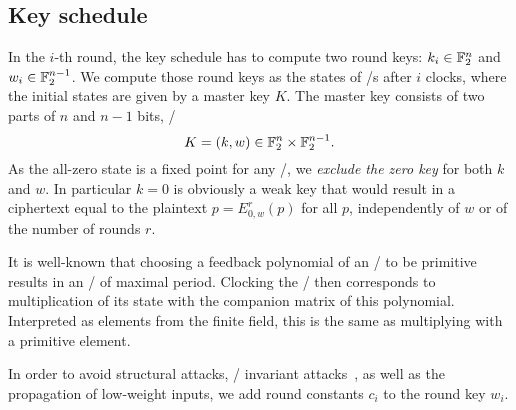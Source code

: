 \subsection{Key schedule}
In the $i$-th round, the key schedule has to compute two round keys: $k_i \in \mathbb{F}_2^n$ and $w_i \in \mathbb{F}_2^{n-1}$.
We compute those round keys as the states of \LFSR/s after $i$ clocks, where the initial states are given by a master key $K$.
The master key consists of two parts of $n$ and $n-1$ bits, \ie/
\begin{equation*}
    K=(k,w) \in \mathbb{F}_2^n \times \mathbb{F}_2^{n-1}.
\end{equation*}
As the all-zero state is a fixed point for any \LFSR/, we \emph{exclude the zero key} for both $k$ and $w$.
In particular $k=0$ is obviously a weak key that would result in a ciphertext equal to the plaintext $p = E_{0,w}^r(p)$ for all $p$, independently of $w$ or of the number of rounds $r$.

It is well-known that choosing a feedback polynomial of an \LFSR/ to be primitive results in an \LFSR/ of maximal period.
Clocking the \LFSR/ then corresponds to multiplication of its state with the companion matrix of this polynomial.
Interpreted as elements from the finite field, this is the same as multiplying with a primitive element.

In order to avoid structural attacks, \eg/ invariant attacks~, as well as the propagation of low-weight inputs, we add round constants $c_i$ to the round key $w_i$.

